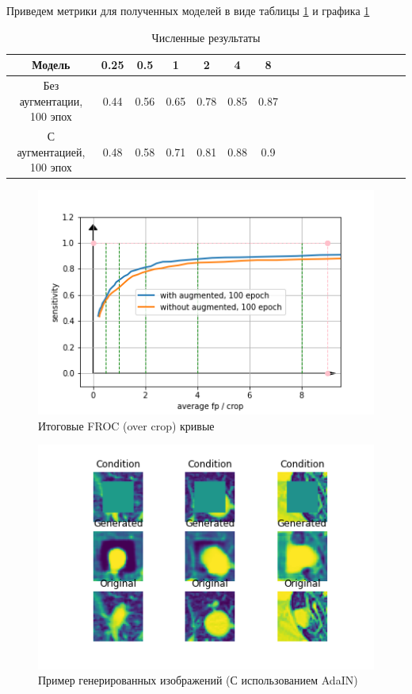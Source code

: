 Приведем метрики для полученных моделей в виде таблицы \ref{tab:result-metrics} и графика \ref{image:final-results}


\begin{table}[!h]
\caption{Численные результаты}\label{tab:result-metrics}
\centering
\begin{tabular}{|*{18}{c|}}\hline
\textbf{Модель} & \textbf{0.25} & \textbf{0.5} & \textbf{1} & \textbf{2} & \textbf{4} & \textbf{8} \\\hline
Без аугментации, 100 эпох & 0.44 & 0.56 & 0.65 & 0.78 & 0.85 & 0.87 \\\hline
С аугментацией, 100 эпох & 0.48 & 0.58 & 0.71 & 0.81 & 0.88 & 0.9 \\\hline
\end{tabular}
\end{table}

\begin{figure}[!h]
\includegraphics[width=\linewidth]{images/result_plot.png}
\caption{Итоговые FROC (over crop) кривые}\label{image:final-results}
\centering
\end{figure}


\begin{figure}[!h]
\includegraphics[width=\linewidth]{images/gan-results/adain.png}
\caption{Пример генерированных изображений (С использованием AdaIN)}\label{cgan-adain-results}
\centering
\end{figure}

